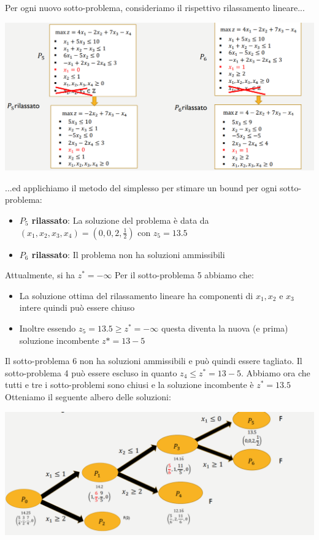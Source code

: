 \documentclass[12pt]{article}
\begin{document}
\newpage
Per ogni nuovo sotto-problema, consideriamo il rispettivo rilassamento lineare...
\begin{center}
    \includegraphics[width = 0.90\linewidth]{Images/81.png}
\end{center}
...ed applichiamo il metodo del simplesso per stimare un bound per ogni sotto-problema:
\begin{itemize}
    \item \textbf{$P_5$ rilassato}: La soluzione del problema è data da $(x_1,x_2,x_3,x_4) = (0,0,2, \frac{1}{2})$ con $z_5 = 13.5$
    \item \textbf{$P_6$ rilassato}: Il problema non ha soluzioni ammissibili 
\end{itemize}
Attualmente, si ha $z^* = -\infty$ \newline
Per il sotto-problema 5 abbiamo che:
\begin{itemize}
    \item La soluzione ottima del rilassamento lineare ha componenti di $x_1, x_2$ e $x_3$ intere quindi può essere chiuso
    \item Inoltre essendo $z_5 = 13.5 \geq z^* = -\infty$ questa diventa la nuova (e prima) soluzione incombente $z*=13-5$
\end{itemize}
Il sotto-problema 6 non ha soluzioni ammissibili e può quindi essere tagliato. Il sotto-problema 4 può essere escluso in quanto $z_4 \leq z^* = 13-5$.
Abbiamo ora che tutti e tre i sotto-problemi sono chiusi e la soluzione incombente è $z^* = 13.5$
Otteniamo il seguente albero delle soluzioni:
\begin{center}
    \includegraphics[width = 0.90\linewidth]{Images/82.png}
\end{center}
\end{document}
